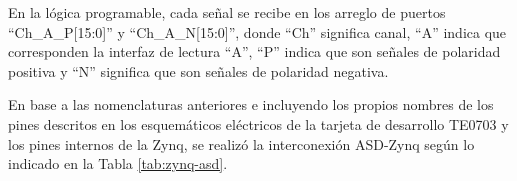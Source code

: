 	En la lógica programable, cada señal se recibe en los arreglo de puertos ``Ch\_A\_P[15:0]'' y ``Ch\_A\_N[15:0]'', donde ``Ch'' significa canal, ``A'' indica que corresponden la interfaz de lectura ``A'', ``P'' indica que son señales de polaridad positiva y ``N'' significa que son señales de polaridad negativa.
	
	En base a las nomenclaturas anteriores e incluyendo los propios nombres de los pines descritos en los esquemáticos eléctricos de la tarjeta de desarrollo TE0703\cite{TrenzElectronicGmbHTE0703SCH-TE0703-06} y los pines internos de la Zynq, se realizó la interconexión ASD-Zynq según lo indicado en la Tabla \ref{tab:zynq-asd}.
	
	\begin{table}[]
		\centering
\end{table}
